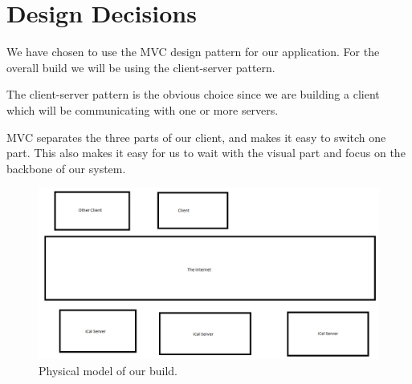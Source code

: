 \section{Design Decisions}
We have chosen to use the MVC design pattern for our \CS application. For the overall build we will be using the client-server pattern.

The client-server pattern is the obvious choice since we are building a client which will be communicating with one or more servers.

MVC separates the three parts of our client, and makes it easy to switch one part. This also makes it easy for us to wait with the visual part and focus on the backbone of our system.

\begin{figure}[h!]
  \includegraphics[width=\textwidth,natwidth=1109,natheight=559]{illustrations/PhysicalModel.png}
  \caption{Physical model of our build.}
\end{figure}

\newpage